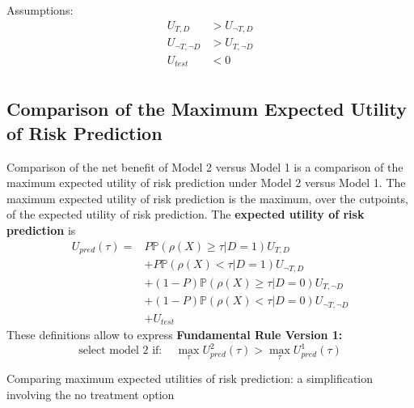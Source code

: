 	Assumptions:
	\[
	\begin{aligned}
    		U_{T, D} 	&> U_{\neg T, D}\\
		U_{\neg T, \neg D} &> U_{T, \neg D} \\
		U_{test} &< 0 \\
    	\end{aligned}
	\]
	
\subsection{Comparison of the Maximum Expected Utility of Risk Prediction}	

	Comparison of the net benefit of Model 2 versus Model 1 is a comparison of the maximum expected utility of risk prediction under Model 2 versus Model 1.
	The maximum expected utility of risk prediction is the maximum, over the cutpoints, of the expected utility of risk prediction.
	The \textbf{expected utility of risk prediction} is
	\[
	\begin{aligned}
    		U_{pred}(\tau) 
		=& P \mathbb{P}(\rho(X) \geq \tau | D = 1) U_{T, D}\\
    		&+ P \mathbb{P}(\rho(X) < \tau | D = 1) U_{\neg T, D}\\
		&+ (1 - P) \mathbb{P}(\rho(X) \geq \tau | D = 0) U_{T, \neg D}\\
		&+ (1 - P) \mathbb{P}(\rho(X) < \tau | D = 0) U_{\neg T, \neg D}\\
		&+ U_{test}
    	\end{aligned}
	\]
	These definitions allow to express 
	\textbf{Fundamental Rule Version 1:}
	\[
		\text{select model 2 if}: \quad \max_\tau U^2_{pred}(\tau) > \max_\tau U^1_{pred}(\tau)
	\]
	
	Comparing maximum expected utilities of risk prediction: a simplification involving the no treatment option
	
